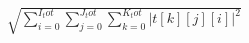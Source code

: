 \documentclass{article}
\begin{document}
$\sqrt{ \sum_{i=0}^{I_tot}\sum_{j=0}^{J_tot}\sum_{k=0}^{K_tot} |t[k][j][i]|^2 }$
\pagebreak
\end{document}
